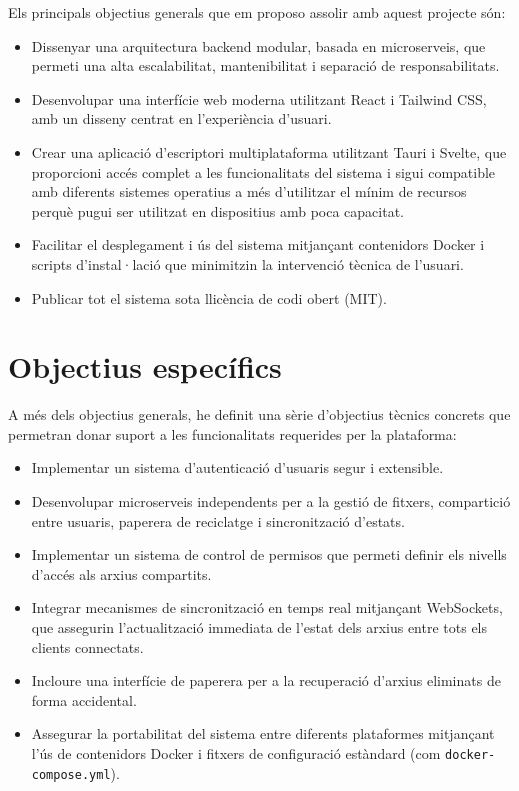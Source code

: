 Els principals objectius generals que em proposo assolir amb aquest projecte s\'on:

\begin{itemize}
  \item Dissenyar una arquitectura backend modular, basada en microserveis, que permeti una alta escalabilitat, mantenibilitat i separaci\'o de responsabilitats.
  \item Desenvolupar una interf\'icie web moderna utilitzant React i Tailwind CSS, amb un disseny centrat en l'experi\`encia d'usuari.
  \item Crear una aplicaci\'o d'escriptori multiplataforma utilitzant Tauri i Svelte, que proporcioni acc\'es complet a les funcionalitats del sistema i sigui compatible amb diferents sistemes operatius a m\'es d'utilitzar el m\'inim de recursos perqu\`e pugui ser utilitzat en dispositius amb poca capacitat.
  \item Facilitar el desplegament i \'us del sistema mitjan\c{c}ant contenidors Docker i scripts d'instal·laci\'o que minimitzin la intervenci\'o t\`ecnica de l'usuari.
  \item Publicar tot el sistema sota llic\`encia de codi obert (MIT).
\end{itemize}

\section{Objectius espec\'ifics}

A m\'es dels objectius generals, he definit una s\`erie d'objectius t\`ecnics concrets que permetran donar suport a les funcionalitats requerides per la plataforma:

\begin{itemize}
  \item Implementar un sistema d'autenticaci\'o d'usuaris segur i extensible.
  \item Desenvolupar microserveis independents per a la gesti\'o de fitxers, compartici\'o entre usuaris, paperera de reciclatge i sincronitzaci\'o d'estats.
  \item Implementar un sistema de control de permisos que permeti definir els nivells d'acc\'es als arxius compartits.
  \item Integrar mecanismes de sincronitzaci\'o en temps real mitjan\c{c}ant WebSockets, que assegurin l'actualitzaci\'o immediata de l'estat dels arxius entre tots els clients connectats.
  \item Incloure una interf\'icie de paperera per a la recuperaci\'o d'arxius eliminats de forma accidental.
  \item Assegurar la portabilitat del sistema entre diferents plataformes mitjan\c{c}ant l'\'us de contenidors Docker i fitxers de configuraci\'o est\`andard (com \texttt{docker-compose.yml}).
\end{itemize}

